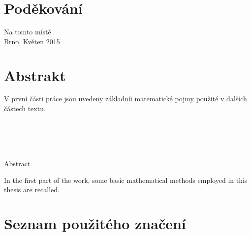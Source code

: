 \documentclass[a4paper,12pt]{report}
\theoremstyle{definition} \newtheorem{definice}[veta]{Definice}
\theoremstyle{remark}
\begin{document}
\chapter*{Poděkování}
Na tomto místě
\\

Brno, Květen 2015
\\


\chapter*{Abstrakt}
V první části práce jsou uvedeny základníi matematické pojmy použité v dalších částech textu. 
\\\\\\\\\\

\begin{flushright} {{\Huge Abstract}} \vspace{38pt} \end{flushright}
In the first part of the work, some basic mathematical methods employed in this thesis are recalled. 

\tableofcontents {}

\chapter*{Seznam použitého značení}
\end{document}
